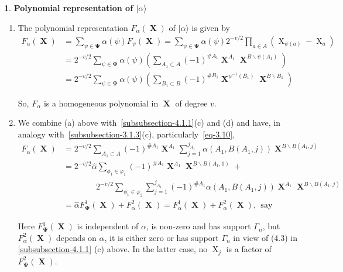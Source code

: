 \documentclass[a4paper,12pt]{article}
\DeclareMathOperator{\x}{\mathrm{X}}
\theoremstyle{definition}
\theoremstyle{underlinethm}
\theoremstyle{definition}
\newtheorem{subsubsec}{}[subsection]
\begin{document}
\begin{subsubsec}\label{subsubsection-4.1.2}
\textbf{Polynomial representation of $| \alpha \rangle $} 

\begin{enumerate}[label=(\alph*)]
\item The polynomial representation $F_{\alpha}(\boldsymbol{\x})$ of $| \alpha \rangle$ is given by
\begin{align*}
F_{\alpha}(\boldsymbol{\x}) &= \sum_{\psi \in \boldsymbol{\Psi}} \alpha(\psi) F_{\psi} (\boldsymbol{\x}) = \sum_{\psi \in \boldsymbol{\Psi}} \alpha(\psi) 2^{-v/2} \prod_{a \in A} \left(\x_{\psi(a)} - \x_{a}\right)\\
& = 2^{-v/2} \sum_{\psi \in \boldsymbol{\Psi}} \alpha(\psi)\left(\sum_{A_{1}\subset A} (-1)^{\#A_{1}} \boldsymbol{\x}^{A_{1}} \boldsymbol{\x}^{B \smallsetminus \psi (A_{1})} \right)\\
& = 2^{-v/2} \sum_{\psi \in \boldsymbol{\Psi}} \alpha(\psi) \left(\sum_{B_{1}\subset B} (-1)^{\# B_{1}} \boldsymbol{\x}^{\psi^{-1}(B_{1})} \boldsymbol{\x}^{B \smallsetminus B_{1}} \right)\tag{4.7}\label{eq-4.7}
\end{align*}

So, $F_{\alpha}$ is a homogeneous polynomial in $\boldsymbol{\x}$ of degree $v$.

\item We combine (a) above with~\eqref{subsubsection-4.1.1}(c) and (d) and have, in analogy with~\eqref{subsubsection-3.1.3}(c), particularly~\eqref{eq-3.10},
\begin{align*}
F_{\alpha}(\boldsymbol{\x}) &= 2^{-v/2} \sum_{A_{1}\subset A}(-1)^{\# A_{1}} \boldsymbol{\x}^{A_{1}} \sum_{j=1}^{j_{A_{1}}} \alpha(A_{1}, B(A_{1}, j)) \boldsymbol{\x}^{B\smallsetminus B(A_{1},j)}\\
& = 2^{-v/2} \hat{\alpha} \sum_{\phi_{1}\in \varphi_{1}} (-1)^{\# A_{1}} \boldsymbol{\x}^{A_{1}} \boldsymbol{\x}^{B \smallsetminus B(A_{1},1)} +\\
    & \qquad\qquad2^{-v/2} \sum_{\phi_{1}\in \varphi_{2}} \sum_{j=1}^{j_{A_{1}}} (-1)^{\# A_{1}} \alpha(A_{1}, B(A_{1}, j)) \boldsymbol{\x}^{A_{1}} \boldsymbol{\x}^{B \smallsetminus B(A_{1}, j)}\\
 & = \hat{\alpha} F_{\boldsymbol{\Psi}}^{1} (\boldsymbol{\x}) + F_{\alpha}^{2}(\boldsymbol{\x}) = F_{\alpha}^{1}(\boldsymbol{\x}) + F_{\alpha}^{2} (\boldsymbol{\x}),~~ \text{say}\tag{4.8}\label{eq-4.8}    
\end{align*}

Here $F_{\boldsymbol{\Psi}}^{1}(\boldsymbol{\x})$ is independent of $\alpha$, is non-zero and has support $\Gamma_{n}$, but $F_{\alpha}^{2}(\boldsymbol{\x})$ depends on $\alpha$, it is either zero or has support $\Gamma_{n}$ in view of (4.3) in \eqref{subsubsection-4.1.1} (c) above. In the latter case, no $\x_{j}$ is a factor of $F_{\boldsymbol{\Psi}}^{2}(\boldsymbol{\x})$.


\end{enumerate}
\end{subsubsec}
\end{document}
